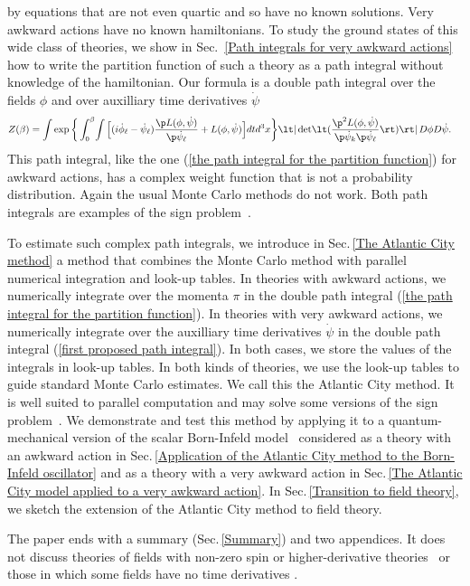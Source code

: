 \documentclass[prd,preprint,floatfix,showpacs]{revtex4-1}
\begin{document}
by equations that are not even quartic
and so have no known solutions.
Very awkward actions
have no known hamiltonians.
To study the ground states
of this wide class of theories,
we show in
Sec.~\ref {Path integrals for very awkward actions}
how to write the partition function
of such a theory as a path integral
without knowledge of the hamiltonian.
Our formula is a double path integral
over the fields \( \phi \) and over
auxilliary time derivatives \( \dot \psi \)
\begin{equation}
   \begin{split}
Z(\beta) = {}&
\! \int \exp \bigg\{ \int_0^\beta \! \int 
\Big[ ( i \dot \phi_\ell
- \dot \psi_\ell ) \frac{ \p  L(\phi, \dot \psi) }
{ \p \dot \psi_\ell }
+ L(\phi, \dot \psi) 
\Big] dt d^3x \bigg\}  \lt| \det \! 
\lt( \frac{ \p^2  L(\phi, \dot \psi) }
{ \p \dot \psi_k \p \dot \psi_\ell }  \rt) \rt|
\, D\phi D\dot\psi .
\label {first proposed path integral}
   \end{split}
\end{equation}
This path integral, like the one 
(\ref {the path integral for the partition function})
for awkward actions,
has a complex weight function
that is not a probability distribution.
Again the usual Monte Carlo methods
do not work.  
Both path integrals are examples
of the sign problem~\cite{Behtash:2015loa, *Scorzato:2015qts, *Gattringer:2016kco}.
\par
To estimate such complex path integrals,
we introduce in 
Sec.\,\ref{The Atlantic City method}
a method that combines the 
Monte Carlo method with parallel numerical integration
and look-up tables.
In theories with awkward actions,
we numerically integrate over the momenta
\( \pi \) in the double path integral 
(\ref {the path integral for the partition function})\@.
In theories with very awkward actions,
we numerically integrate over the auxilliary
time derivatives \( \dot \psi \) in the double path integral 
(\ref {first proposed path integral})\@.
In both cases, we store the values of the integrals
in look-up tables.
In both kinds of theories,
we use the look-up tables
to guide standard Monte Carlo estimates.
We call this the Atlantic City method.
It is well suited to
parallel computation and may solve
some versions of the sign 
problem~\cite{Behtash:2015loa, *Scorzato:2015qts, *Gattringer:2016kco}.
We demonstrate and test this method
by applying it to a
quantum-mechanical version of the scalar Born-Infeld 
model~\cite{Born:1934gh, *Born:1934dia, *Born:1935ap}
considered as a theory with an awkward action
in
Sec.\,\ref {Application of the Atlantic City method to the Born-Infeld oscillator} and as a theory with a very awkward action in
Sec.\,\ref{The Atlantic City model applied to a very awkward action}\@.
In Sec.\,\ref{Transition to field theory},
we sketch the extension of the Atlantic City method
to field theory.
\par
The paper ends with a summary (Sec.\,\ref{Summary})
and two appendices.
It does not discuss theories of fields with non-zero spin
or higher-derivative
theories~\cite{Ostrogradsky1850,*BenderMannheim2007, *
BenderMannheim2008} 
or those in which some 
fields have no time derivatives
\cite{Dirac1950, *Dirac1958, *Dirac1964}\@.
\end{document}
